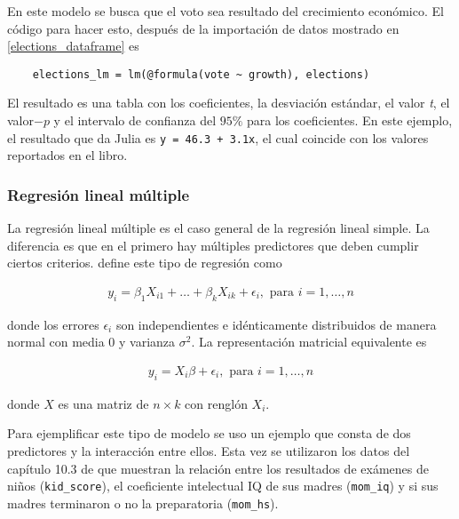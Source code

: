 En este modelo se busca que el voto sea resultado del crecimiento económico. El código para hacer esto, después de la importación de datos mostrado en \ref{elections_dataframe} es

\begin{verbatim}
	elections_lm = lm(@formula(vote ~ growth), elections)
\end{verbatim}

El resultado es una tabla con los coeficientes, la desviación estándar, el valor \textit{t}, el valor$-p$ y el intervalo de confianza del $95 \% $ para los coeficientes. En este ejemplo, el resultado que da \textsf{Julia} es \texttt{y = 46.3 + 3.1x}, el cual coincide con los valores reportados en el libro.

\subsubsection{Regresión lineal múltiple}
La regresión lineal múltiple es el caso general de la regresión lineal simple. La diferencia es que en el primero hay múltiples predictores que deben cumplir ciertos criterios. \cite{regression_other_stories} define este tipo de regresión como 

\begin{equation*}
    \begin{aligned}
    y_i = \beta_1 X_{i1} + \dots + \beta_k X_{ik} + \epsilon_i, \text{ para } i = 1, \dots, n
    \end{aligned}
\end{equation*}

\noindent donde los errores $\epsilon_i$ son independientes e idénticamente distribuidos de manera normal con media 0 y varianza $\sigma^2$. La representación matricial equivalente es 

\begin{equation} \label{eq_rlm}
    \begin{aligned}
        y_i = X_i \beta + \epsilon_i, \text{ para } i = 1, \dots, n
    \end{aligned}
\end{equation}

\noindent donde $X$ es una matriz de $n \times k$ con renglón $X_i$.

Para ejemplificar este tipo de modelo se uso un ejemplo que consta de dos predictores y la interacción entre ellos. Esta vez se utilizaron los datos del capítulo 10.3 de \cite{regression_other_stories} que muestran la relación entre los resultados de exámenes de niños (\texttt{kid\_score}), el coeficiente intelectual IQ de sus madres (\texttt{mom\_iq}) y si sus madres terminaron o no la preparatoria (\texttt{mom\_hs}). 

